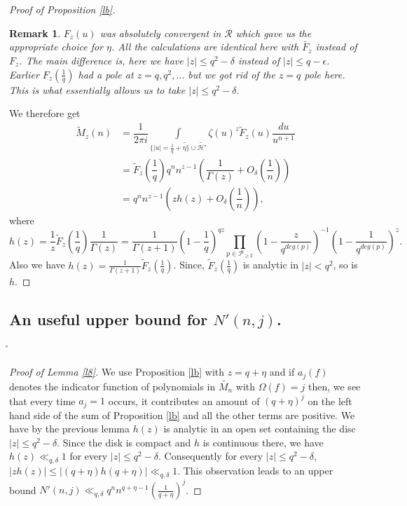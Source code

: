 \documentclass[12pt]{amsart}
\numberwithin{equation}{section}
\newtheorem{remark}[theorem]{Remark}
\theoremstyle{remark}
\theoremstyle{remark}
\theoremstyle{definition}
\begin{document}
\begin{proof}[Proof of Proposition \ref{lb}]
\begin{remark}
$F_z(u)$ was absolutely convergent in $\mathcal{R}$ which gave us the appropriate choice for $\eta$. All the calculations are identical here with $\widetilde{F_z}$ instead of $F_z$. The main difference is, here we have $|z|\leqslant q^2-\delta$ instead of $|z|\leqslant q-\epsilon$. Earlier ${F}_z\left(\frac{1}{q}\right)$ had a pole at $z=q,q^2,\ldots$ but we got rid of the $z=q$ pole here. This is what essentially allows us to take $|z|\leqslant q^2-\delta.$
\end{remark}
We therefore get
\begin{align}
\nonumber
\widetilde{M}_z(n) &= \dfrac{1}{2\pi i}\displaystyle\int\limits_{\{|u|=\frac{1}{q}+\widetilde{\eta\}}\cup\widetilde{\mathcal{H}'}} \zeta(u)^z\widetilde{F}_z(u)\dfrac{du}{u^{n+1}}\\
\nonumber
&=\widetilde{F}_z\left(\dfrac{1}{q}\right)q^n n^{z-1} \left( \dfrac{1}{\Gamma(z)}+O_{\delta}\left(\dfrac{1}{n}\right)\right)\\
\nonumber
&=q^nn^{z-1}\left(zh(z)+ O_{\delta}\left(\dfrac{1}{n}\right) \right),
\end{align}
where 
$$h(z)=\dfrac{1}{z}\widetilde{F}_z\left(\dfrac{1}{q}\right)\dfrac{1}{\Gamma(z)}=\dfrac{1}{\Gamma(z+1)}\left( 1-\dfrac{1}{q}\right)^{qz}\displaystyle\prod\limits_{p\in\mathcal{P}_{\geqslant 2}}\left(1-\frac{z}{q^{deg(p)}}\right)^{-1}\left( 1-\frac{1}{q^{deg(p)}}\right)^z.$$
Also we have $h(z)=\frac{1}{\Gamma(z+1)}\widetilde{F}_z\left(\frac{1}{q}\right)$. Since, $\widetilde{F}_z\left(\frac{1}{q}\right)$ is analytic in $|z|<q^2$, so is $h$.
\end{proof}
\subsection{An useful upper bound for $N'(n,j)$.}
\r*
\begin{proof}[Proof of Lemma \ref{l8}]\label{li}
We use Proposition \ref{lb} with $z=q+\eta$ and if $a_j(f)$ denotes the indicator function of polynomials in $\widetilde{M_n}$ with $\Omega(f)=j$ then, we see that every time $a_j=1$ occurs, it contributes an amount of $\left(q+\eta\right)^j$ on the left hand side of the sum of Proposition \ref{lb} and all the other terms are positive. We have by the previous lemma $h(z)$ is analytic in an open set containing the disc $|z|\leqslant q^2-\delta$. Since the disk is compact and $h$ is continuous there, we have $h(z)\ll_{q,\delta} 1$ for every $|z|\leqslant q^2-\delta$. Consequently for every $|z|\leqslant q^2-\delta$, $|zh(z)|\leqslant |(q+\eta)h(q+\eta)|\ll_{q,\delta} 1$. This observation leads to an upper bound $N'(n,j) \ll_{q,\delta} q^n n^{q+\eta-1}\left(\frac{1}{q+\eta}\right)^j$.
\end{proof}
\end{document}
